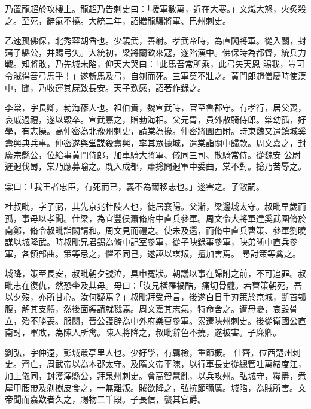 \begin{pinyinscope}
 乃置龍超於攻樓上。龍超乃告刺史曰：「援軍數萬，近在大寒。」文熾大怒，火炙殺之。至死，辭氣不撓。大統二年，詔贈龍驤將軍、巴州刺史。



 乙速孤佛保，北秀容胡酋也。少驍武，善射。孝武帝時，為直閣將軍。從入關，封蒲子縣公，并賜弓矢。大統初，梁將蘭欽來寇，遂陷漢中。佛保時為都督，統兵力戰。知將敗，乃先城未陷，仰天大哭曰：「此馬吾常所乘，此弓矢天恩
 賜我，豈可令賊得吾弓馬乎！」遂斬馬及弓，自刎而死。三軍莫不壯之。黃門郎趙僧慶時使漢中，聞，乃收運其屍致長安。天子歎感，詔著作錄之。



 李棠，字長卿，勃海蓚人也。祖伯貴，魏宣武時，官至魯郡守。有孝行，居父喪，哀戚過禮，遂以毀卒。宣武嘉之，贈勃海相。父元胄，員外散騎侍郎。棠幼孤，好學，有志操。高仲密為北豫州刺史，請棠為掾。仲密將圖西附。時東魏又遣鎮城奚壽興典兵事。仲密遂與堂謀殺壽興，率其眾據城，遣棠詣關中歸款。周文嘉之，封廣宗縣公，位給事黃門侍郎，加車騎大將軍、儀同三司、散騎常侍。從魏安
 公尉遲迥伐蜀，棠乃應募喻之。既入成都，蕭捴問迥軍中委曲，棠不對。捴乃苦辱之。



 棠曰：「我王者忠臣，有死而已，義不為爾移志也。」遂害之。子敞嗣。



 杜叔毗，字子弼，其先京兆杜陵人也，徙居襄陽。父漸，梁邊城太守。叔毗早歲而孤，事母以孝聞。仕梁，為宜豐侯蕭脩府中直兵參軍。周文令大將軍達奚武圍脩於南鄭，脩令叔毗詣闕請和。周文見而禮之。使未及還，而脩中直兵曹策、參軍劉曉謀以城降武。時叔毗兄君錫為脩中記室參軍，從子映錄事參軍，映弟晰中直兵參軍，各領部曲。策等忌之，懼不同己，遂誣以謀叛，擅加害焉。
 尋討策等禽之。



 城降，策至長安，叔毗朝夕號泣，具申冤狀。朝議以事在歸附之前，不可追罪。叔毗志在復仇，然恐坐及其母。母曰：「汝兄橫罹禍酷，痛切骨髓。若曹策朝死，吾以夕歿，亦所甘心。汝何疑焉？」叔毗拜受母言，後遂白日手刃策於京城，斷首瓠腹，解其支體，然後面縛請就戮焉。周文嘉其志氣，特命舍之。遭母憂，哀毀骨立，殆不勝喪。服闋，晉公護辟為中外府樂曹參軍。累遷陜州刺史。後從衛國公直南討，軍敗，為陳人所禽。陳人將降之，叔毗辭色不撓，遂被害。子廉卿。



 劉弘，字仲遠，彭城叢亭里人也。少好學，有羈檢，重節概。
 仕齊，位西楚州刺史。齊亡，周武帝以為本郡太守。及隋文帝平陳，以行車長史從總管吐萬緒度江，加上儀同，封濩澤縣公，拜泉州刺史。會高智慧亂，以兵攻州。弘城守，糧盡，煮犀甲腰帶及剝樹皮食之，一無離叛。賊欲降之，弘抗節彌厲。城陷，為賊所害。文帝聞而嘉歎者久之，賜物二千段。子長信，襲其官爵。




\end{pinyinscope}
